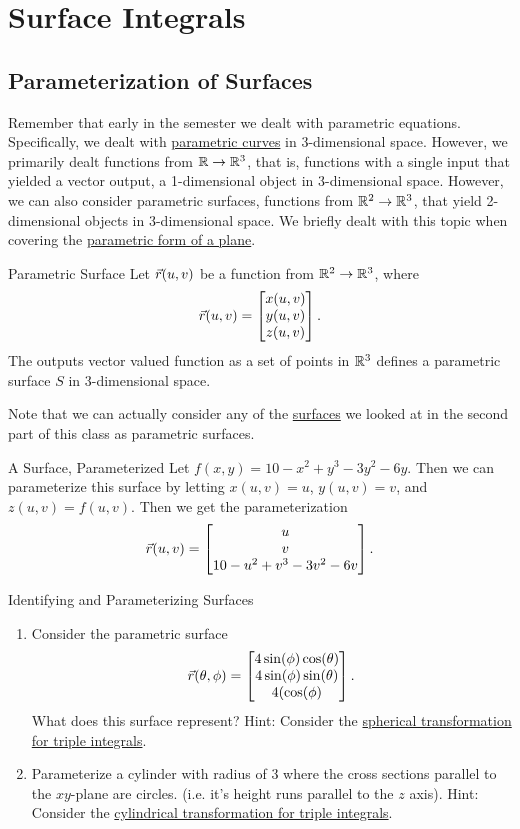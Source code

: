 \section{Surface Integrals}
\subsection{Parameterization of Surfaces}
Remember that early in the semester we dealt with parametric equations. Specifically, we dealt with \hyperlink{paraderiv}{parametric curves} in 3-dimensional space. However, we primarily dealt functions from $\mathbb{R}\to\mathbb{R}^3$, that is, functions with a single input that yielded a vector output, a 1-dimensional object in 3-dimensional space. However, we can also consider parametric surfaces, functions from $\mathbb{R}^2\to\mathbb{R}^3$, that yield 2-dimensional objects in 3-dimensional space. We briefly dealt with this topic when covering the \hyperlink{paraplane}{parametric form of a plane}.

\begin{definition}{Parametric Surface}
Let $\vec{r}(u,v)$ be a function from $\mathbb{R}^2\to\mathbb{R}^3$, where $$\vec{r}(u,v)=\begin{bmatrix}x(u,v)\\y(u,v)\\z(u,v)\end{bmatrix}.$$ The outputs vector valued function as a set of points in $\mathbb{R}^3$ defines a parametric surface $S$ in $3$-dimensional space.
\end{definition}

Note that we can actually consider any of the \hyperlink{surf1}{surfaces} we looked at in the second part of this class as parametric surfaces.

\begin{example}{A Surface, Parameterized}
Let $f(x,y)=10-x^2+y^3-3y^2-6y$. Then we can parameterize this surface by letting $x(u,v)=u$, $y(u,v)=v$, and $z(u,v)=f(u,v)$. Then we get the parameterization $$\vec{r}(u,v)=\begin{bmatrix}u\\v\\10-u^2+v^3-3v^2-6v\end{bmatrix}.$$
\end{example}

\begin{exercise}{Identifying and Parameterizing Surfaces}
\begin{enumerate}
\item Consider the parametric surface $$\vec{r}(\theta,\phi)=\begin{bmatrix}4\sin(\phi)\cos(\theta)\\4\sin(\phi)\sin(\theta)\\4(\cos(\phi)\end{bmatrix}.$$ What does this surface represent? Hint: Consider the \hyperlink{spherical}{spherical transformation for triple integrals}.
\vspace{1em}
\item Parameterize a cylinder with radius of 3 where the cross sections parallel to the $xy$-plane are circles. (i.e. it's height runs parallel to the $z$ axis). Hint: Consider the \hyperlink{cylind}{cylindrical transformation for triple integrals}.
\end{enumerate}
\end{exercise}

